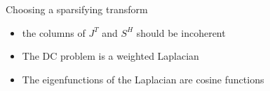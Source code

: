 \documentclass[12pt]{beamer}
\begin{document}
\begin{frame}{Choosing a sparsifying transform}
\begin{itemize}
  \item the columns of $J^T$ and $S^H$ should be incoherent
  \item The DC problem is a weighted Laplacian
  \item The eigenfunctions of the Laplacian are cosine functions


\begin{figure}
\end{figure}

\end{itemize}

\end{frame}
\end{document}
